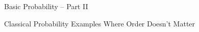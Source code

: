 \documentclass[handout]{beamer}
\date{Lecture \# 6}
\begin{document}
 





\begin{frame}[plain]
	\titlepage 
	

\end{frame} 


\begin{frame}

\begin{center}
 \Huge Basic Probability -- Part II
\end{center}

\end{frame}

\begin{frame}

\centering \Huge Classical Probability Examples Where Order Doesn't Matter

\end{frame}
\end{document}
